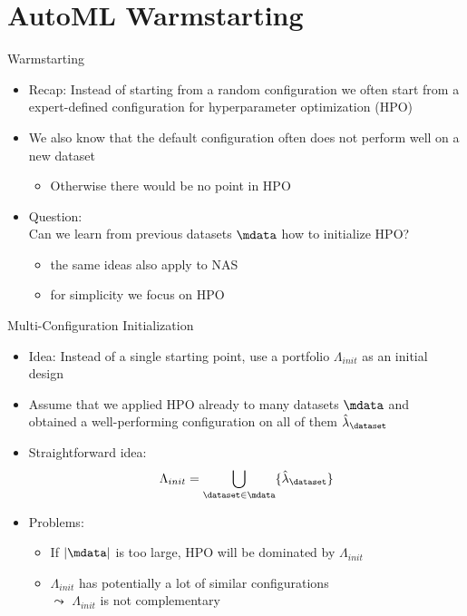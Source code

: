 \section{AutoML Warmstarting}
\begin{frame}[c]{Warmstarting}

\begin{itemize}
	\item Recap: Instead of starting from a random configuration we often start from a expert-defined configuration for hyperparameter optimization (HPO)
	\pause
	\item We also know that the default configuration often does not perform well on a new dataset
	\begin{itemize}
		\item Otherwise there would be no point in HPO
	\end{itemize}
	\pause
	\item Question:\\ \alert{Can we learn from previous datasets $\mdata$ how to initialize HPO?}
	\begin{itemize}
		\item the same ideas also apply to NAS
		\item for simplicity we focus on HPO 
	\end{itemize}
\end{itemize}

\end{frame}
\begin{frame}[c]{Multi-Configuration Initialization}

\begin{itemize}
	\item Idea: Instead of a single starting point, use a \alert{portfolio $\Lambda_{init}$} as an initial design
	\item Assume that we applied HPO already to many datasets $\mdata$ and\\
	obtained a well-performing configuration on all of them $\hat{\lambda}_\dataset$
	\item Straightforward idea: 
	$$\Lambda_{init} = \bigcup_{\dataset \in \mdata} \{ \hat{\lambda}_\dataset \}$$
	\item Problems:
	\begin{itemize}
		\item If $|\mdata|$ is too large, HPO will be dominated by $\Lambda_{init}$
		\item $\Lambda_{init}$ has potentially a lot of similar configurations\\
		$\leadsto$ $\Lambda_{init}$ is not complementary
	\end{itemize}
\end{itemize}


\end{frame}
